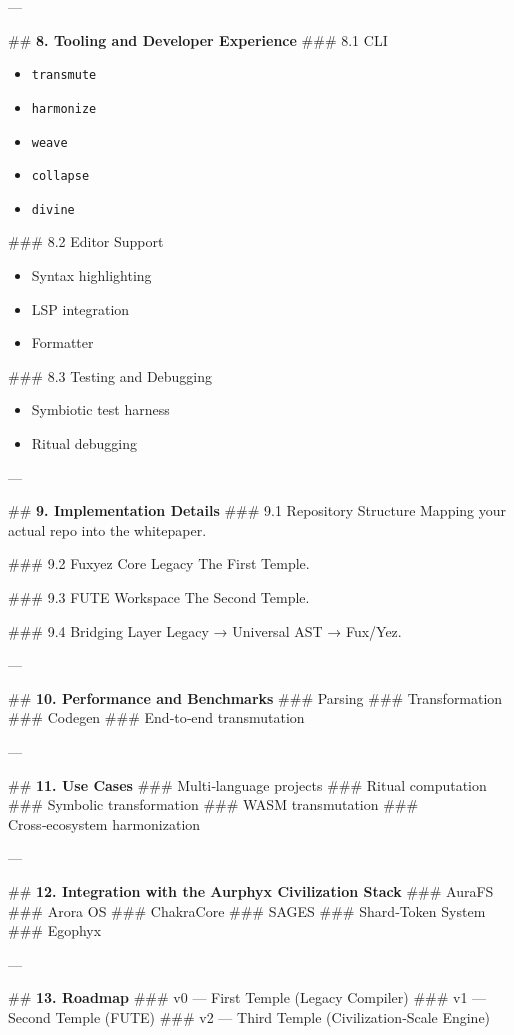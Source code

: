 \documentclass[12pt, a4paper]{book}
\begin{document}
---

\#\# \textbf{8. Tooling and Developer Experience}
\#\#\# 8.1 CLI  
\begin{itemize}
  \item \texttt{transmute}  
  \item \texttt{harmonize}  
  \item \texttt{weave}  
  \item \texttt{collapse}  
  \item \texttt{divine}  
\end{itemize}

\#\#\# 8.2 Editor Support  
\begin{itemize}
  \item Syntax highlighting  
  \item LSP integration  
  \item Formatter  
\end{itemize}

\#\#\# 8.3 Testing and Debugging  
\begin{itemize}
  \item Symbiotic test harness  
  \item Ritual debugging  
\end{itemize}

---

\#\# \textbf{9. Implementation Details}
\#\#\# 9.1 Repository Structure  
Mapping your actual repo into the whitepaper.

\#\#\# 9.2 Fuxyez Core Legacy  
The First Temple.

\#\#\# 9.3 FUTE Workspace  
The Second Temple.

\#\#\# 9.4 Bridging Layer  
Legacy → Universal AST → Fux/Yez.

---

\#\# \textbf{10. Performance and Benchmarks}
\#\#\# Parsing  
\#\#\# Transformation  
\#\#\# Codegen  
\#\#\# End‑to‑end transmutation  

---

\#\# \textbf{11. Use Cases}
\#\#\# Multi‑language projects  
\#\#\# Ritual computation  
\#\#\# Symbolic transformation  
\#\#\# WASM transmutation  
\#\#\# Cross‑ecosystem harmonization  

---

\#\# \textbf{12. Integration with the Aurphyx Civilization Stack}
\#\#\# AuraFS  
\#\#\# Arora OS  
\#\#\# ChakraCore  
\#\#\# SAGES  
\#\#\# Shard‑Token System  
\#\#\# Egophyx  

---

\#\# \textbf{13. Roadmap}
\#\#\# v0 — First Temple (Legacy Compiler)  
\#\#\# v1 — Second Temple (FUTE)  
\#\#\# v2 — Third Temple (Civilization‑Scale Engine)  
\end{document}

